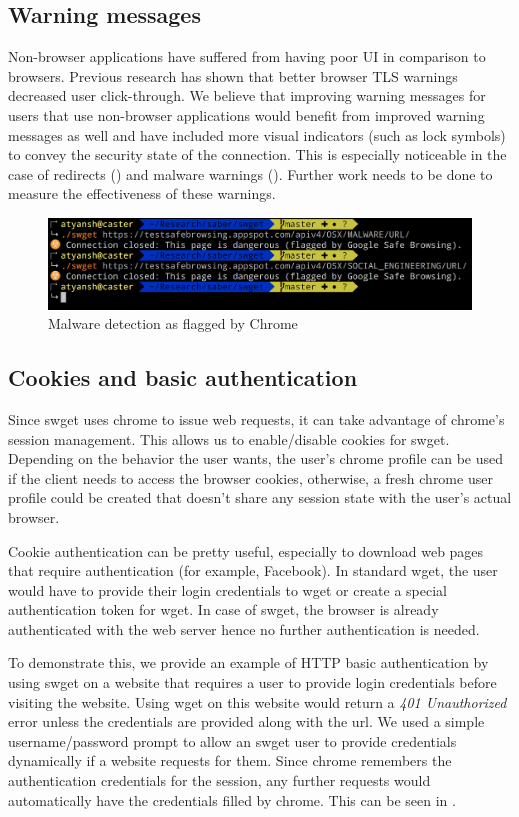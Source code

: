 \subsection{Warning messages}
Non-browser applications have suffered from having poor UI in comparison to
browsers. Previous research has shown that better browser TLS warnings
decreased user click-through. We believe that improving warning messages for
users that use non-browser applications would benefit from improved warning
messages as well and have included more visual indicators (such as lock symbols)
to convey the security state of the connection. This is especially noticeable
in the case of redirects () and malware warnings
(). Further work needs to be done to measure the
effectiveness of these warnings.

\begin{figure}[h]
  \includegraphics[width=\textwidth]{figures/malware}
  \caption{Malware detection as flagged by Chrome} 
  \label{fig:malware-saber}
\end{figure}

\subsection{Cookies and basic authentication}
Since swget uses chrome to issue web requests, it can take advantage of
chrome's session management. This allows us to enable/disable cookies for
swget. Depending on the behavior the user wants, the user's chrome profile can
be used if the client needs to access the browser cookies, otherwise, a fresh
chrome user profile could be created that doesn't share any session state with
the user's actual browser.

Cookie authentication can be pretty useful, especially to download web pages
that require authentication (for example, Facebook). In standard wget, the user
would have to provide their login credentials to wget or create a special
authentication token for wget. In case of swget, the browser is already
authenticated with the web server hence no further authentication is needed.

To demonstrate this, we provide an example of HTTP basic authentication by
using swget on a website that requires a user to provide login credentials
before visiting the website. Using wget on this website would return a
\emph{401 Unauthorized} error unless the credentials are provided along with
the url. We used a simple username/password prompt to allow an swget user to
provide credentials dynamically if a website requests for them. Since chrome
remembers the authentication credentials for the session, any further requests
would automatically have the credentials filled by chrome. This can be seen in
.

